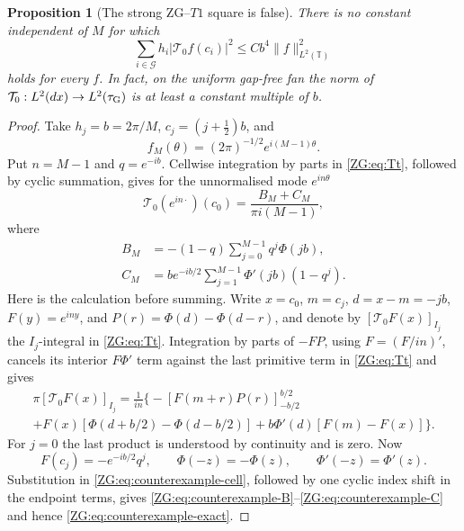 \documentclass[11pt]{amsart}
\numberwithin{equation}{section}
\newtheorem{proposition}[theorem]{Proposition}
\theoremstyle{definition}
\theoremstyle{remark}
\newcommand{\T}{\mathbb T}
\begin{document}
\begin{proposition}[The strong ZG--$T1$ square is false]
\label{ZG:prop:Peano-counterexample}
There is no constant independent of $M$ for which
\begin{equation}\label{ZG:eq:false-Peano-square}
 \sum_{i\in\mathcal G}h_i|\mathcal T_0f(c_i)|^2
 \le C b^4\|f\|_{L^2(\T)}^2
\end{equation}
holds for every $f$.  In fact, on the uniform gap-free fan the norm of
$\mathcal T_0:L^2(dx)\to L^2(\tau_{\rm G})$ is at least a constant
multiple of $b$.
\end{proposition}

\begin{proof}
Take $h_j=b=2\pi/M$, $c_j=(j+\tfrac12)b$, and
\[
 f_M(\theta)=(2\pi)^{-1/2}e^{i(M-1)\theta}.
\]
Put $n=M-1$ and $q=e^{-ib}$.  Cellwise integration by parts in
\eqref{ZG:eq:Tt}, followed by cyclic summation, gives for the unnormalised
mode $e^{in\theta}$
\begin{equation}\label{ZG:eq:counterexample-exact}
 \mathcal T_0(e^{in\cdot})(c_0)
 =\frac{B_M+C_M}{\pi i(M-1)},
\end{equation}
where
\begin{align}
 B_M&=-(1-q)\sum_{j=0}^{M-1}q^j\Phi(jb),
 \label{ZG:eq:counterexample-B}\\
 C_M&=b e^{-ib/2}\sum_{j=1}^{M-1}
       \Phi'(jb)(1-q^j).
 \label{ZG:eq:counterexample-C}
\end{align}
Here is the calculation before summing.  Write $x=c_0$, $m=c_j$,
$d=x-m=-jb$, $F(y)=e^{iny}$, and
$P(r)=\Phi(d)-\Phi(d-r)$, and denote by
$[\mathcal T_0F(x)]_{I_j}$ the $I_j$-integral in \eqref{ZG:eq:Tt}.
Integration by parts of $-FP$, using
$F=(F/in)'$, cancels its interior $F\Phi'$ term against the last
primitive term in \eqref{ZG:eq:Tt} and gives
\begin{multline}\label{ZG:eq:counterexample-cell}
 \pi[\mathcal T_0F(x)]_{I_j}
 =\frac1{in}\Big\{
 -[F(m+r)P(r)]_{-b/2}^{b/2}\\
 +F(x)[\Phi(d+b/2)-\Phi(d-b/2)]
 +b\Phi'(d)[F(m)-F(x)]\Big\}.
\end{multline}
For $j=0$ the last product is understood by continuity and is zero.
Now
\[
 F(c_j)=-e^{-ib/2}q^j,
 \qquad \Phi(-z)=-\Phi(z),
 \qquad \Phi'(-z)=\Phi'(z).
\]
Substitution in \eqref{ZG:eq:counterexample-cell}, followed by one cyclic
index shift in the endpoint terms, gives
\eqref{ZG:eq:counterexample-B}--\eqref{ZG:eq:counterexample-C} and hence
\eqref{ZG:eq:counterexample-exact}.


\end{proof}
\end{document}
